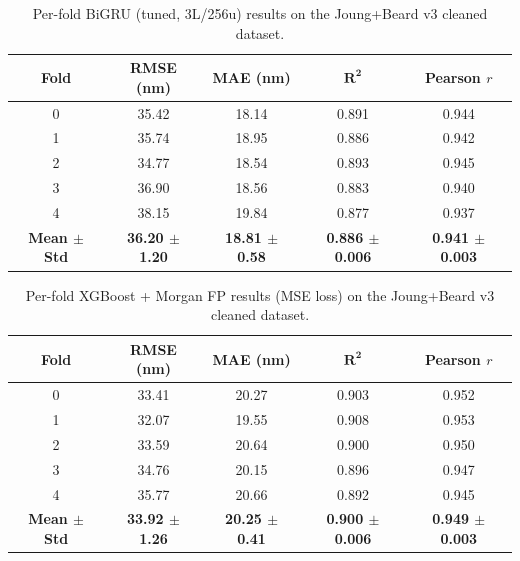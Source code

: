 \documentclass[journal=jcisd8,manuscript=suppinfo]{achemso}
\begin{document}
\begin{table}[htbp]
\centering
\caption{Per-fold BiGRU (tuned, 3L/256u) results on the Joung+Beard v3 cleaned dataset.}
\label{tab:perfold_bigru_tuned}
\begin{tabular}{ccccc}
\toprule
\textbf{Fold} & \textbf{RMSE (nm)} & \textbf{MAE (nm)} & $\boldsymbol{R^2}$ & \textbf{Pearson $r$} \\
\midrule
0 & 35.42 & 18.14 & 0.891 & 0.944 \\
1 & 35.74 & 18.95 & 0.886 & 0.942 \\
2 & 34.77 & 18.54 & 0.893 & 0.945 \\
3 & 36.90 & 18.56 & 0.883 & 0.940 \\
4 & 38.15 & 19.84 & 0.877 & 0.937 \\
\midrule
\textbf{Mean $\pm$ Std} & \textbf{36.20 $\pm$ 1.20} & \textbf{18.81 $\pm$ 0.58} & \textbf{0.886 $\pm$ 0.006} & \textbf{0.941 $\pm$ 0.003} \\
\bottomrule
\end{tabular}
\end{table}

\begin{table}[htbp]
\centering
\caption{Per-fold XGBoost + Morgan FP results (MSE loss) on the Joung+Beard v3 cleaned dataset.}
\label{tab:perfold_xgboost}
\begin{tabular}{ccccc}
\toprule
\textbf{Fold} & \textbf{RMSE (nm)} & \textbf{MAE (nm)} & $\boldsymbol{R^2}$ & \textbf{Pearson $r$} \\
\midrule
0 & 33.41 & 20.27 & 0.903 & 0.952 \\
1 & 32.07 & 19.55 & 0.908 & 0.953 \\
2 & 33.59 & 20.64 & 0.900 & 0.950 \\
3 & 34.76 & 20.15 & 0.896 & 0.947 \\
4 & 35.77 & 20.66 & 0.892 & 0.945 \\
\midrule
\textbf{Mean $\pm$ Std} & \textbf{33.92 $\pm$ 1.26} & \textbf{20.25 $\pm$ 0.41} & \textbf{0.900 $\pm$ 0.006} & \textbf{0.949 $\pm$ 0.003} \\
\bottomrule
\end{tabular}
\end{table}
\end{document}
